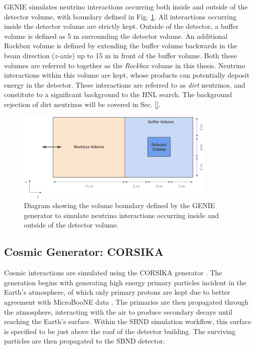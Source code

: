 GENIE simulates neutrino interactions occurring both inside and outside of the detector volume, with boundary defined in Fig. \ref{fig:Rockbox_Volume}.  
All interactions occurring inside the detector volume are strictly kept.
Outside of the detector, a buffer volume is defined as 5 m surrounding the detector volume.
An additional Rockbox volume is defined by extending the buffer volume backwards in the beam direction ($z$-axis) up to 15 m in front of the buffer volume.
Both these volumes are referred to together as the \textit{Rockbox} volume in this thesis.
Neutrino interactions within this volume are kept, whose products can potentially deposit energy in the detector.
These interactions are referred to as \textit{dirt} neutrinos, and constitute to a significant background to the HNL search.
The background rejection of dirt neutrinos will be covered in Sec. \ref{}.

\begin{figure}[htbp!] 
\centering    
\includegraphics[width=0.85\textwidth]{Rockbox_Volume}
\caption[Rockbox_Volume]{
Diagram showing the volume boundary defined by the GENIE generator to simulate neutrino interactions occurring inside and outside of the detector volume. 
}
\label{fig:Rockbox_Volume}
\end{figure}

\subsection{Cosmic Generator: CORSIKA}
\label{sec:gen_corsika}

Cosmic interactions are simulated using the CORSIKA generator \cite{corsika}.
The generation begins with generating high energy primary particles incident in the Earth's atmosphere, of which only primary protons are kept due to better agreement with MicroBooNE data \cite{}. 
The primaries are then propagated through the atmosphere, interacting with the air to produce secondary decays until reaching the Earth's surface.
Within the SBND simulation workflow, this surface is specified to be just above the roof of the detector building.
The surviving particles are then propagated to the SBND detector.

